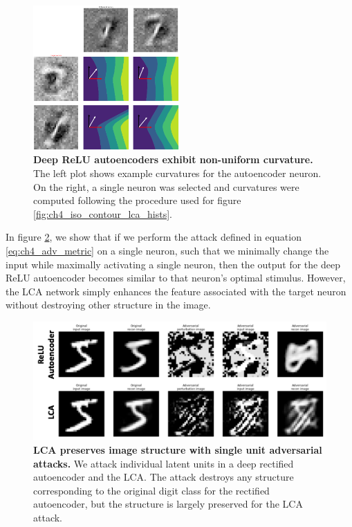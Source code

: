 \begin{figure}
    \centering
    \includegraphics[width=0.5\textwidth]{figures/drae_deep_curvature.png}
    \caption{\textbf{Deep ReLU autoencoders exhibit non-uniform curvature.} The left plot shows example curvatures for the autoencoder neuron. On the right, a single neuron was selected and curvatures were computed following the procedure used for figure \ref{fig:ch4_iso_contour_lca_hists}.}
    \label{fig:ch4_drae_curvature}
\end{figure}


In figure \ref{fig:ch4_marzi_unit_relu_lca}, we show that if we perform the attack defined in equation \eqref{eq:ch4_adv_metric} on a single neuron, such that we minimally change the input while maximally activating a single neuron, then the output for the deep ReLU autoencoder becomes similar to that neuron's optimal stimulus. However, the LCA network simply enhances the feature associated with the target neuron without destroying other structure in the image.

\begin{figure}[h]
    \centering
    \includegraphics[width=\textwidth]{figures/adv_marzi_unit_relu_lca.png}
    \caption{\textbf{LCA preserves image structure with single unit adversarial attacks.} We attack individual latent units in a deep rectified autoencoder and the LCA. The attack destroys any structure corresponding to the original digit class for the rectified autoencoder, but the structure is largely preserved for the LCA attack.}
    \label{fig:ch4_marzi_unit_relu_lca}
\end{figure}


